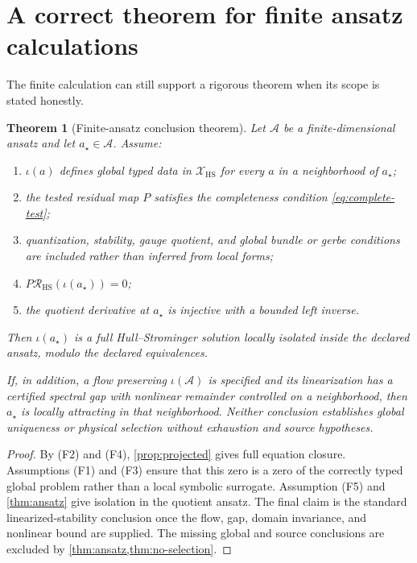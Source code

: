 \documentclass[11pt]{article}
\newcommand{\cA}{\mathcal{A}}
\newcommand{\cR}{\mathcal{R}}
\newcommand{\cX}{\mathcal{X}}
\newcommand{\HS}{\mathrm{HS}}
\numberwithin{equation}{section}
\theoremstyle{definition}
\theoremstyle{plain}
\newtheorem{theorem}[definition]{Theorem}
\theoremstyle{remark}
\begin{document}
\section{A correct theorem for finite ansatz calculations}

The finite calculation can still support a rigorous theorem when its scope
is stated honestly.

\begin{theorem}[Finite-ansatz conclusion theorem]\label{thm:finite}
Let \(\cA\) be a finite-dimensional ansatz and let \(a_\star\in\cA\).
Assume:
\begin{enumerate}[label=\textnormal{(F\arabic*)},leftmargin=3.4em]
\item \(\iota(a)\) defines global typed data in \(\cX_{\HS}\) for every
      \(a\) in a neighborhood of \(a_\star\);
\item the tested residual map \(P\) satisfies the completeness condition
      \cref{eq:complete-test};
\item quantization, stability, gauge quotient, and global bundle or gerbe
      conditions are included rather than inferred from local forms;
\item \(P\cR_{\HS}(\iota(a_\star))=0\);
\item the quotient derivative at \(a_\star\) is injective with a bounded
      left inverse.
\end{enumerate}
Then \(\iota(a_\star)\) is a full Hull--Strominger solution locally isolated
inside the declared ansatz, modulo the declared equivalences.

If, in addition, a flow preserving \(\iota(\cA)\) is specified and its
linearization has a certified spectral gap with nonlinear remainder
controlled on a neighborhood, then \(a_\star\) is locally attracting in that
neighborhood.  Neither conclusion establishes global uniqueness or physical
selection without exhaustion and source hypotheses.
\end{theorem}

\begin{proof}
By (F2) and (F4), \cref{prop:projected} gives full equation closure.
Assumptions (F1) and (F3) ensure that this zero is a zero of the correctly
typed global problem rather than a local symbolic surrogate.  Assumption
(F5) and \cref{thm:ansatz} give isolation in the quotient ansatz.  The final
claim is the standard linearized-stability conclusion once the flow, gap,
domain invariance, and nonlinear bound are supplied.  The missing global and
source conclusions are excluded by \cref{thm:ansatz,thm:no-selection}.
\end{proof}
\end{document}
